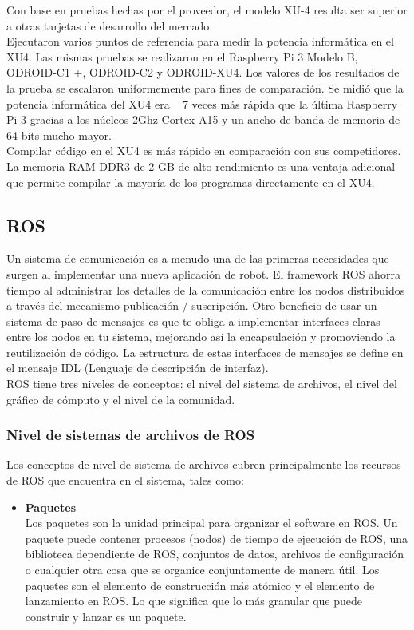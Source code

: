 Con base en pruebas hechas por el proveedor, el modelo XU-4 resulta ser superior
a otras tarjetas de desarrollo del mercado.\\
Ejecutaron varios puntos de referencia para medir la potencia informática en el XU4.
Las mismas pruebas se realizaron en el Raspberry Pi 3 Modelo B, ODROID-C1 +, ODROID-C2
y ODROID-XU4.
Los valores de los resultados de la prueba se escalaron uniformemente para fines de
comparación. Se midió que la potencia informática del XU4 era ~ 7 veces más rápida que
la última Raspberry Pi 3 gracias a los núcleos 2Ghz Cortex-A15 y un ancho de banda de
memoria de 64 bits mucho mayor.\\
Compilar código en el XU4 es más rápido en comparación con sus competidores. La memoria RAM DDR3 de 2 GB de
alto rendimiento es una ventaja adicional que permite compilar la mayoría de los
programas directamente en el XU4.\cite{WEB:HK2020}


\subsection{ROS}
Un sistema de comunicación es a menudo una de las primeras necesidades que surgen al
implementar una nueva aplicación de robot. El framework ROS ahorra tiempo al administrar los detalles de la 
comunicación entre los nodos distribuidos a través del mecanismo publicación / suscripción.
Otro beneficio de usar un sistema de paso de mensajes es que te obliga a implementar
interfaces claras entre los nodos en tu sistema, mejorando así la encapsulación y
promoviendo la reutilización de código. La estructura de estas interfaces de mensajes
se define en el mensaje IDL (Lenguaje de descripción de interfaz).\\
ROS tiene tres niveles de conceptos: el nivel del sistema de archivos, el nivel del gráfico
de cómputo y el nivel de la comunidad. \cite{WEB:ROS}
\subsubsection{Nivel de sistemas de archivos de ROS}
Los conceptos de nivel de sistema de archivos cubren principalmente los recursos de ROS que
encuentra en el sistema, tales como:
\begin{itemize}
	\item \textbf{Paquetes}\\
	      Los paquetes son la unidad principal para organizar el software
	      en ROS. Un paquete puede contener procesos (nodos) de tiempo de ejecución de ROS,
	      una biblioteca dependiente de ROS, conjuntos de datos, archivos de configuración o
	      cualquier otra cosa que se organice conjuntamente de manera útil. Los paquetes son
	      el elemento de construcción más atómico y el elemento de lanzamiento en ROS. Lo
	      que significa que lo más granular que puede construir y lanzar es un paquete.
\end{itemize}
